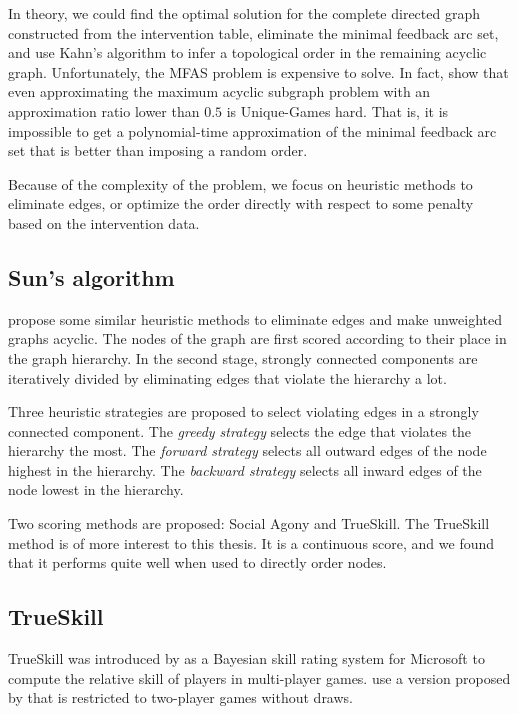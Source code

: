 In theory, we could find the optimal solution for the complete directed graph constructed from the intervention table, eliminate the minimal feedback arc set, and use Kahn's algorithm to infer a topological order in the remaining acyclic graph. Unfortunately, the MFAS problem is expensive to solve. In fact, \citet{guruswami2008beating} show that even approximating the maximum acyclic subgraph problem with an approximation ratio lower than $0.5$ is Unique-Games hard. That is, it is impossible to get a polynomial-time approximation of the minimal feedback arc set that is better than imposing a random order.

Because of the complexity of the problem, we focus on heuristic methods to eliminate edges, or optimize the order directly with respect to some penalty based on the intervention data.

\subsection{Sun's algorithm}
\citet{sun2017breaking} propose some similar heuristic methods to eliminate edges and make unweighted graphs acyclic. The nodes of the graph are first scored according to their place in the graph hierarchy. In the second stage, strongly connected components are iteratively divided by eliminating edges that violate the hierarchy a lot. 

Three heuristic strategies are proposed to select violating edges in a strongly connected component. The \textit{greedy strategy} selects the edge that violates the hierarchy the most. The \textit{forward strategy} selects all outward edges of the node highest in the hierarchy. The \textit{backward strategy} selects all inward edges of the node lowest in the hierarchy. 

Two scoring methods are proposed: Social Agony and TrueSkill. The TrueSkill method is of more interest to this thesis. It is a continuous score, and we found that it performs quite well when used to directly order nodes.

\subsection{TrueSkill}
TrueSkill was introduced by \citet{herbrich2007trueskill} as a Bayesian skill rating system for Microsoft to compute the relative skill of players in multi-player games. \citet{sun2017breaking} use a version proposed by \citet{liu2013question} that is restricted to two-player games without draws. 



